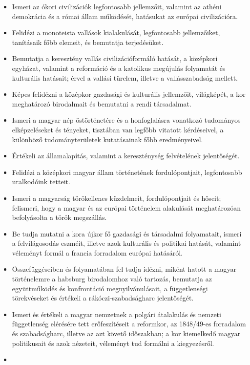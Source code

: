\begin{itemize}
\item
  Ismeri az ókori civilizációk legfontosabb jellemzőit, valamint az
  athéni demokrácia és a római állam működését, hatásukat az európai
  civilizációra.
\item
  Felidézi a monoteista vallások kialakulását, legfontosabb
  jellemzőiket, tanításaik főbb elemeit, és bemutatja terjedésüket.
\item
  Bemutatja a keresztény vallás civilizációformáló hatását, a középkori
  egyházat, valamint a reformáció és a katolikus megújulás folyamatát és
  kulturális hatásait; érvel a vallási türelem, illetve a
  vallásszabadság mellett.
\item
  Képes felidézni a középkor gazdasági és kulturális jellemzőit,
  világképét, a kor meghatározó birodalmait és bemutatni a rendi
  társadalmat.
\item
  Ismeri a magyar nép őstörténetére és a honfoglalásra vonatkozó
  tudományos elképzeléseket és tényeket, tisztában van legfőbb vitatott
  kérdéseivel, a különböző tudományterületek kutatásainak főbb
  eredményeivel.
\item
  Értékeli az államalapítás, valamint a kereszténység felvételének
  jelentőségét.
\item
  Felidézi a középkori magyar állam történetének fordulópontjait,
  legfontosabb uralkodóink tetteit.
\item
  Ismeri a magyarság törökellenes küzdelmeit, fordulópontjait és hőseit;
  felismeri, hogy a magyar és az európai történelem alakulását
  meghatározóan befolyásolta a török megszállás.
\item
  Be tudja mutatni a kora újkor fő gazdasági és társadalmi folyamatait,
  ismeri a felvilágosodás eszméit, illetve azok kulturális és politikai
  hatását, valamint véleményt formál a francia forradalom európai
  hatásáról.
\item
  Összefüggéseiben és folyamatában fel tudja idézni, miként hatott a
  magyar történelemre a habsburg birodalomhoz való tartozás, bemutatja
  az együttműködés és konfrontáció megnyilvánulásait, a függetlenségi
  törekvéseket és értékeli a rákóczi-szabadságharc jelentőségét.
\item
  Ismeri és értékeli a magyar nemzetnek a polgári átalakulás és nemzeti
  függetlenség elérésére tett erőfeszítéseit a reformkor, az 1848/49-es
  forradalom és szabadságharc, illetve az azt követő időszakban; a kor
  kiemelkedő magyar politikusait és azok nézeteit, véleményt tud
  formálni a kiegyezésről.
\item

\end{itemize}
